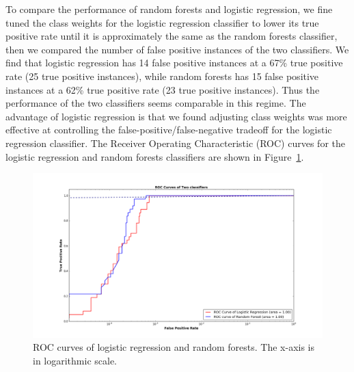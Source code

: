 To compare the performance of random forests and logistic regression, we fine tuned the class weights for the logistic regression classifier to lower its true positive rate until it is approximately the same as the random forests classifier, then we compared the number of false positive instances of the two classifiers.
We find that logistic regression has 14 false positive instances at a 67\% true positive rate (25 true positive instances),
while random forests has 15 false positive instances at a 62\% true positive rate (23 true positive instances).
Thus the performance of the two classifiers seems comparable in this regime.
The advantage of logistic regression is that we found adjusting class weights was more effective at controlling the false-positive/false-negative tradeoff for the logistic regression classifier.
The Receiver Operating Characteristic (ROC) curves for the logistic regression and random forests classifiers are shown in Figure~\ref{fig:roc}.

\begin{figure}[t]
\begin{center}
\includegraphics[width=1.0\columnwidth]{roc_curves_log_line.png}
\end{center}
\caption{ROC curves of logistic regression and random forests. The x-axis is in logarithmic scale.}
\label{fig:roc}
\end{figure}


